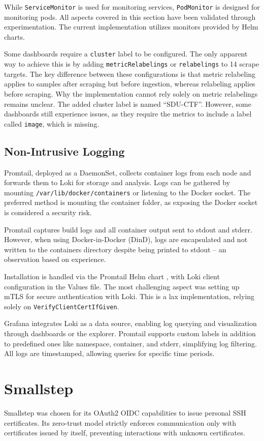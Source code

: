 While \texttt{ServiceMonitor} is used for monitoring services, \texttt{PodMonitor} is designed for monitoring pods. All aspects covered in this section have been validated through experimentation. The current implementation utilizes monitors provided by Helm charts.

Some dashboards require a \texttt{cluster} label to be configured. The only apparent way to achieve this is by adding \texttt{metricRelabelings} or \texttt{relabelings} to 14 scrape targets. The key difference between these configurations is that metric relabeling applies to samples after scraping but before ingestion, whereas relabeling applies before scraping. Why the implementation cannot rely solely on metric relabelings remains unclear. The added cluster label is named ``SDU-CTF''. However, some dashboards still experience issues, as they require the metrics to include a label called \texttt{image}, which is missing.

\subsection{Non-Intrusive Logging}
Promtail, deployed as a DaemonSet, collects container logs from each node and forwards them to Loki for storage and analysis. Logs can be gathered by mounting \texttt{/var/lib/docker/containers} or listening to the Docker socket. The preferred method is mounting the container folder, as exposing the Docker socket is considered a security risk.

Promtail captures build logs and all container output sent to stdout and stderr. However, when using Docker-in-Docker (DinD), logs are encapsulated and not written to the containers directory despite being printed to stdout -- an observation based on experience.

Installation is handled via the Promtail Helm chart \parencite{grafana_promtail_helm}, with Loki client configuration in the Values file. The most challenging aspect was setting up mTLS for secure authentication with Loki. This is a lax implementation, relying solely on \texttt{VerifyClientCertIfGiven}.

Grafana integrates Loki as a data source, enabling log querying and visualization through dashboards or the explorer. Promtail supports custom labels in addition to predefined ones like namespace, container, and stderr, simplifying log filtering. All logs are timestamped, allowing queries for specific time periods.

\section{Smallstep}\label{sec:smallstep}
Smallstep was chosen for its OAuth2 OIDC capabilities to issue personal SSH certificates. Its zero-trust model strictly enforces communication only with certificates issued by itself, preventing interactions with unknown certificates.

